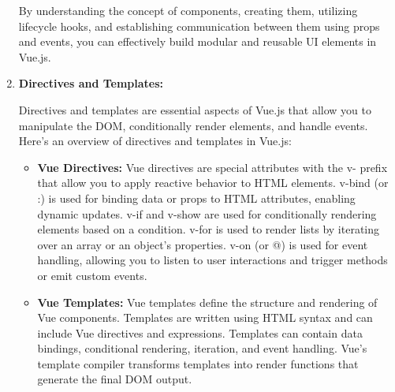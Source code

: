 \begin{enumerate}
By understanding the concept of components, creating them, utilizing lifecycle hooks, and establishing communication between them using props and events, you can effectively build modular and reusable UI elements in Vue.js.
\item \textbf{Directives and Templates:}

Directives and templates are essential aspects of Vue.js that allow you to manipulate the DOM, conditionally render elements, and handle events. Here's an overview of directives and templates in Vue.js:
\begin{itemize}
    \item \textbf{Vue Directives:}
        Vue directives are special attributes with the v- prefix that allow you to apply reactive behavior to HTML elements.
        v-bind (or :) is used for binding data or props to HTML attributes, enabling dynamic updates.
        v-if and v-show are used for conditionally rendering elements based on a condition.
        v-for is used to render lists by iterating over an array or an object's properties.
        v-on (or @) is used for event handling, allowing you to listen to user interactions and trigger methods or emit custom events.

   \item \textbf{Vue Templates:}
        Vue templates define the structure and rendering of Vue components.
        Templates are written using HTML syntax and can include Vue directives and expressions.
        Templates can contain data bindings, conditional rendering, iteration, and event handling.
        Vue's template compiler transforms templates into render functions that generate the final DOM output.
    \end{itemize}
\end{enumerate}
